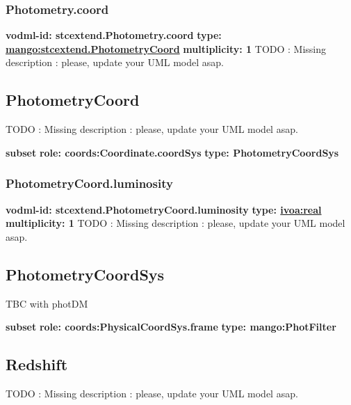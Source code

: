     \subsubsection{Photometry.coord}
      \textbf{vodml-id: stcextend.Photometry.coord} \newline
      \textbf{type: \hyperref[sect:stcextend.PhotometryCoord]{mango:stcextend.PhotometryCoord}} \newline
      \textbf{multiplicity: 1} \newline 
      TODO : Missing description : please, update your UML model asap.

  \subsection{PhotometryCoord}
  \label{sect:stcextend.PhotometryCoord}
    TODO : Missing description : please, update your UML model asap.

    \noindent \textbf{subset} \newline
    \indent   \textbf{role: coords:Coordinate.coordSys} \newline
    \indent   \textbf{type: PhotometryCoordSys} \newline


    \subsubsection{PhotometryCoord.luminosity}
      \textbf{vodml-id: stcextend.PhotometryCoord.luminosity} \newline
      \textbf{type: \hyperref[sect:ivoa]{ivoa:real}} \newline
      \textbf{multiplicity: 1} \newline 
      TODO : Missing description : please, update your UML model asap.

  \subsection{PhotometryCoordSys}
  \label{sect:stcextend.PhotometryCoordSys}
    TBC with photDM

    \noindent \textbf{subset} \newline
    \indent   \textbf{role: coords:PhysicalCoordSys.frame} \newline
    \indent   \textbf{type: mango:PhotFilter} \newline


  \subsection{Redshift}
  \label{sect:stcextend.Redshift}
    TODO : Missing description : please, update your UML model asap.

